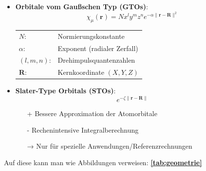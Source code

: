 \begin{itemize}
    \item \textbf{Orbitale vom Gaußschen Typ (GTOs)}: 
    \begin{equation}
        \chi_\mu(\mathbf{r}) = N x^{l} y^{m} z^{n} e^{-\alpha \|\mathbf{r} - \mathbf{R}\|^2}
    \end{equation}
    \begin{tabular}{@{}ll@{}}
        \( N \): & Normierungskonstante \\
        \( \alpha \): & Exponent (radialer Zerfall) \\
        \( (l, m, n) \): & Drehimpulsquantenzahlen \\
        \( \mathbf{R} \): & Kernkoordinate \((X, Y, Z)\)
    \end{tabular}
    \autocite{Reinhold2015}

    \item \textbf{Slater-Type Orbitals (STOs)}: 
    \[ e^{-\zeta \|\mathbf{r} - \mathbf{R}\|} \]
    \begin{itemize}
        \item[+] Bessere Approximation der Atomorbitale
        \item[-] Rechenintensive Integralberechnung
        \item[→] Nur für spezielle Anwendungen/Referenzrechnungen
    \end{itemize}
    \autocite{Reinhold2015,Zülicke2015,alma990015422030206446}
\end{itemize}

Auf diese kann man wie Abbildungen verweisen: \textbf{\cref{tab:geometrie}}


